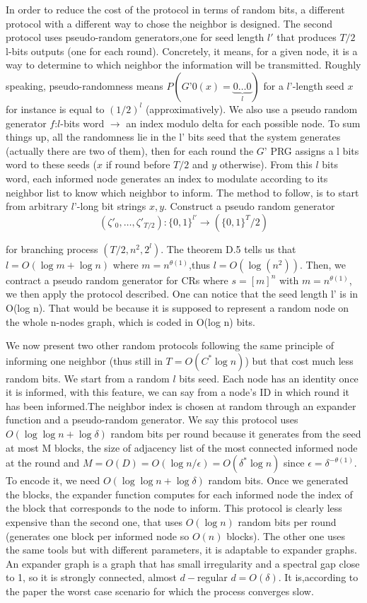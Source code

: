 \documentclass[10pt,journal,a4paper]{IEEEtran}
\begin{document}
In order to reduce the cost of the protocol in terms of random bits, a different protocol with a different way to chose the neighbor is designed. The second protocol uses pseudo-random generators,one for seed length $l'$ that produces $T/2 $ l-bits outputs (one for each round). Concretely, it means, for a given node, it is a way to determine to which neighbor the information will be transmitted. Roughly speaking, pseudo-randomness means $P(G’0(x)=\underbrace{0\dots0}_l)$ for a $l’$-length seed $x$ for instance is equal to $(1/2)^l$ (approximatively). We also use a pseudo random generator $f$:$l$-bits word $\to$ an index modulo delta for each possible node. To sum things up, all the randomness lie in the l’ bits seed that the system generates (actually there are two of them), then for each round the $G’$ PRG assigns a l bits word to these seeds ($x$ if round before $T/2$ and $y$ otherwise). From this $l$ bits word, each informed node generates an index to modulate according to its neighbor list to know which neighbor to inform.
 The method to follow, is to start from arbitrary $l’$-long bit strings $x,y$. Construct a pseudo random generator
  \[
    ( \zeta'_{0}, \dots, \zeta'_{T/2}): \{ 0,1 \}^{l'} \to ( \{0,1\}^T/2 )
   \]
 
for branching process $(T/2,n^2,2^l)$. The theorem D.5 tells us that $l=O(\log m+\log n)$ where $m=n^{\theta(1)}$,thus $l=O(\log(n^2))$. Then, we contract a pseudo random generator for CRs where $s=[m]^n$ with $m=n^{\theta(1)}$, we then apply the protocol described. One can notice that the seed length l’ is in O(log n). That would be because it is supposed to represent a random node on the whole n-nodes graph, which is coded in O(log n) bits.
 
We now present two other random protocols following the same principle of informing one neighbor (thus still in $T=O(C^*\log n)$) but that cost much less random bits. We start from a random $l$ bits seed. Each node has an identity once it is informed, with this feature, we can say from a node's ID in which round it has been informed.The neighbor index is chosen at random through an expander function and a pseudo-random generator. We say this protocol uses $O(\log\log n + \log \delta)$ random bits per round because it generates from the seed at most M blocks, the size of adjacency list of the most connected informed node at the round and $M=O(D)=O(\log n / \epsilon)=O(\delta^*\log n)$ since $\epsilon=\delta^{-\theta(1)}$. To encode it, we need $O(\log\log n + \log \delta)$ random bits. Once we generated the blocks, the expander function computes for each informed node the index of the block that corresponds to the node to inform. This protocol is clearly less expensive than the second one, that uses $O(\log n)$ random bits per round (generates one block per informed node so $O(n)$ blocks). The other one uses the same tools but with different parameters, it is adaptable to expander graphs. An expander graph is a graph that has small irregularity and a spectral gap close to 1, so it is strongly connected, almost $d-$regular $d=O(\delta)$. It is,according to the paper the worst case scenario for which the process converges slow.
 
\end{document}
